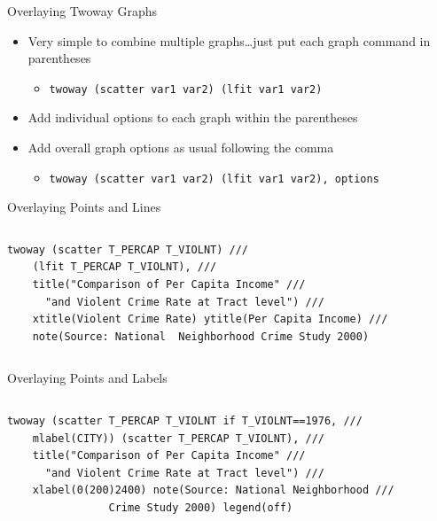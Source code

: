 \documentclass[table,smaller]{beamer}
\begin{document}
\begin{frame}[fragile,label=sec-3-7]{Overlaying Twoway Graphs}
 \begin{itemize}
\item Very simple to combine multiple graphs…just put each graph command in parentheses
\begin{itemize}
\item \texttt{twoway (scatter var1 var2) (lfit var1 var2)}
\end{itemize}
\item Add individual options to each graph within the parentheses
\item Add overall graph options as usual following the comma 
\begin{itemize}
\item \texttt{twoway (scatter var1 var2) (lfit var1 var2), options}
\end{itemize}
\end{itemize}
\end{frame}
\begin{frame}[fragile,label=sec-3-8]{Overlaying Points and Lines}
 \vspace{-.5em} \begin{columns}  \begin{block}{}
\begin{verbatim}
twoway (scatter T_PERCAP T_VIOLNT) ///
    (lfit T_PERCAP T_VIOLNT), ///
    title("Comparison of Per Capita Income" ///
	  "and Violent Crime Rate at Tract level") ///
    xtitle(Violent Crime Rate) ytitle(Per Capita Income) ///
    note(Source: National  Neighborhood Crime Study 2000)
\end{verbatim}

\end{block} \end{columns}
\end{frame}
\begin{frame}[fragile,label=sec-3-9]{Overlaying Points and Labels}
 \vspace{-.5em} \begin{columns}  \begin{block}{}
\begin{verbatim}
twoway (scatter T_PERCAP T_VIOLNT if T_VIOLNT==1976, ///
	mlabel(CITY)) (scatter T_PERCAP T_VIOLNT), ///
    title("Comparison of Per Capita Income" ///
	  "and Violent Crime Rate at Tract level") ///
    xlabel(0(200)2400) note(Source: National Neighborhood ///
			    Crime Study 2000) legend(off)
\end{verbatim}

\end{block} \end{columns}
\end{frame}
\end{document}
